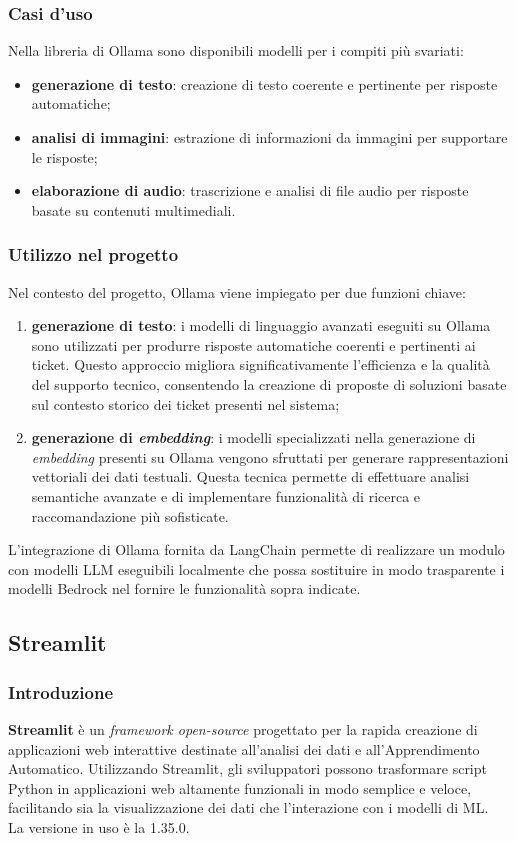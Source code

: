 \subsubsection{Casi d'uso}
Nella libreria di Ollama sono disponibili modelli per i compiti più svariati:
\begin{itemize}
    \item \textbf{generazione di testo}: creazione di testo coerente e pertinente per risposte automatiche;
    \item \textbf{analisi di immagini}: estrazione di informazioni da immagini per supportare le risposte;
    \item \textbf{elaborazione di audio}: trascrizione e analisi di file audio per risposte basate su contenuti multimediali.
\end{itemize}

\subsubsection{Utilizzo nel progetto}
Nel contesto del progetto, Ollama viene impiegato per due funzioni chiave:
\begin{enumerate}
    \item \textbf{generazione di testo}: i modelli di linguaggio avanzati eseguiti su Ollama sono utilizzati per produrre risposte automatiche coerenti e pertinenti ai ticket. Questo approccio migliora significativamente l’efficienza e la qualità del supporto tecnico, consentendo la creazione di proposte di soluzioni basate sul contesto storico dei ticket presenti nel sistema;
    \item \textbf{generazione di \textit{embedding}}: i modelli specializzati nella generazione di \textit{embedding} presenti su Ollama vengono sfruttati per generare rappresentazioni vettoriali dei dati testuali. Questa tecnica permette di effettuare analisi semantiche avanzate e di implementare funzionalità di ricerca e raccomandazione più sofisticate.
\end{enumerate}
L’integrazione di Ollama fornita da LangChain permette di realizzare un modulo con modelli LLM eseguibili localmente che possa sostituire in modo trasparente i modelli Bedrock nel fornire le funzionalità sopra indicate.

\subsection{Streamlit}

\subsubsection{Introduzione}
\textbf{Streamlit} è un \textit{framework open-source} progettato per la rapida creazione di applicazioni web interattive destinate all’analisi dei dati e all'Apprendimento Automatico. Utilizzando Streamlit, gli sviluppatori possono trasformare script Python in applicazioni web altamente funzionali in modo semplice e veloce, facilitando sia la visualizzazione dei dati che l’interazione con i modelli di ML.\\
La versione in uso è la 1.35.0.

